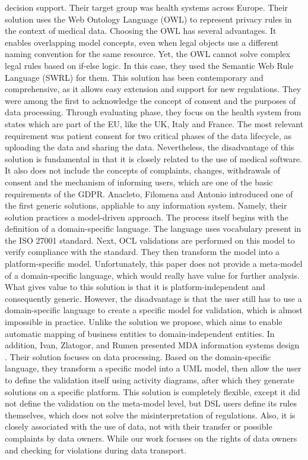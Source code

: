\documentclass[11pt,english]{article}
\begin{document}
decision support. Their target group was health systems across Europe. Their solution uses the Web Ontology Language (OWL) \cite{owl} to represent privacy rules in the context of medical data. Choosing the OWL has several advantages. It enables overlapping model concepts, even when legal objects use a different naming convention for the same resource. Yet, the OWL cannot solve complex legal rules based on if-else logic. In this case, they used the Semantic Web Rule Language (SWRL) \cite{swrl} for them. This solution has been contemporary and comprehensive, as it allows easy extension and support for new regulations. They were among the first to acknowledge the concept of consent and the purposes of data processing. Through evaluating phase, they focus on the health system from states which are part of the EU, like the UK, Italy and France. The most relevant requirement was patient consent for two critical phases of the data lifecycle, as uploading the data and sharing the data. Nevertheless, the disadvantage of this solution is fundamental in that it is closely related to the use of medical software. It also does not include the concepts of complaints, changes, withdrawals of consent and the mechanism of informing users, which are one of the basic requirements of the GDPR. \newline  Anacleto, Filomena and Antonio \cite{correia2017model} introduced one of the first generic solutions, appliable to any information system. Namely, their solution practices a model-driven approach. The process itself begins with the definition of a domain-specific language. The language uses vocabulary present in the ISO 27001 standard. Next, OCL validations are performed on this model to verify compliance with the standard. They then transform the model into a platform-specific model. Unfortunately, this paper does not provide a meta-model of a domain-specific language, which would really have value for further analysis. What gives value to this solution is that it is platform-independent and consequently generic. However, the disadvantage is that the user still has to use a domain-specific language to create a specific model for validation, which is almost impossible in practice. Unlike the solution we propose, which aims to enable automatic mapping of business entities to domain-independent entities. In addition, Ivan, Zlatogor, and Rumen presented MDA information systems design \cite{gaidarskimodel}. Their solution focuses on data processing. Based on the domain-specific language, they transform a specific model into a UML model, then allow the user to define the validation itself using activity diagrams, after which they generate solutions on a specific platform. This solution is completely flexible, except it did not define the validation on the meta-model level, but DSL users define its rules themselves, which does not solve the misinterpretation of regulations. Also, it is closely associated with the use of data, not with their transfer or possible complaints by data owners. While our work focuses on the rights of data owners and checking for violations during data transport.
\end{document}
